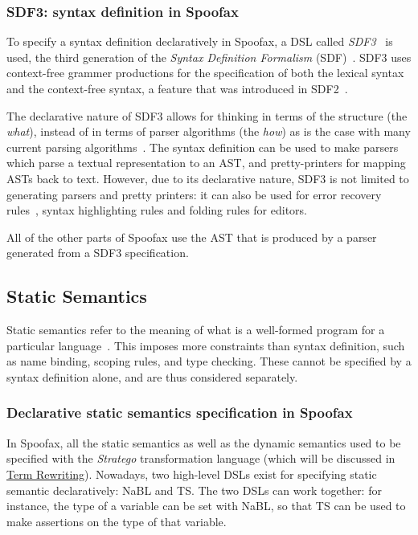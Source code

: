 \subsubsection{SDF3: syntax definition in Spoofax}
\label{sec:orgheadline1}
To specify a syntax definition declaratively in Spoofax, a DSL called
\emph{SDF3}~\cite{Vollebregt12} is used, the third generation of the
\emph{Syntax Definition Formalism} (SDF)~\cite{Heering89}. SDF3 uses
context-free grammer productions for the specification of both the
lexical syntax and the context-free syntax, a feature that was
introduced in SDF2~\cite{Visser97}.

The declarative nature of SDF3 allows for thinking in terms of the
structure (the \emph{what}), instead of in terms of parser algorithms (the
\emph{how}) as is the case with many current parsing
algorithms~\cite{Kats10b}. The syntax definition can be used to
make parsers which parse a textual representation to an AST, and
pretty-printers for mapping ASTs back to text. However, due to its
declarative nature, SDF3 is not limited to generating parsers and
pretty printers: it can also be used for error recovery
rules~\cite{deJonge12}, syntax highlighting rules and folding
rules for editors.

All of the other parts of Spoofax use the AST that is produced by a
parser generated from a SDF3 specification.
\subsection{Static Semantics}
\label{sec-static-analysis}
Static semantics refer to the meaning of what is a well-formed program
for a particular language~\cite{Milner97}. This imposes more
constraints than syntax definition, such as name binding, scoping
rules, and type checking. These cannot be specified by a syntax
definition alone, and are thus considered separately.
\subsubsection{Declarative static semantics specification in Spoofax}
\label{sec:orgheadline2}
In Spoofax, all the static semantics as well as the dynamic semantics
used to be specified with the \emph{Stratego} transformation language
(which will be discussed in \hyperref[sec-term-rewrite]{Term Rewriting}). Nowadays, two high-level
DSLs exist for specifying static semantic declaratively: NaBL and
TS. The two DSLs can work together: for instance, the type of a
variable can be set with NaBL, so that TS can be used to make
assertions on the type of that variable.
